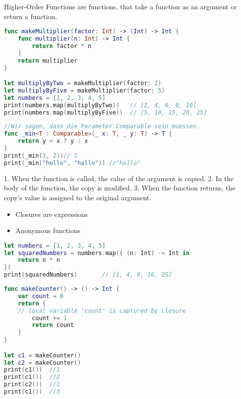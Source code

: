 \begin{breakbox}

Higher-Order Functions are functions, that take a function as an argument or return a function.
\begin{lstlisting}[language=swift]
func makeMultiplier(factor: Int) -> (Int) -> Int {
    func multiplier(n: Int) -> Int {
        return factor * n
    }
    return multiplier
}

let multiplyByTwo = makeMultiplier(factor: 2)
let multiplyByFive = makeMultiplier(factor: 5)
let numbers = [1, 2, 3, 4, 5]
print(numbers.map(multiplyByTwo))   // [2, 4, 6, 8, 10]
print(numbers.map(multiplyByFive))  // [5, 10, 15, 20, 25]
\end{lstlisting}
\end{breakbox}

\begin{breakbox}

\begin{lstlisting}[language=swift]
//Wir sagen, dass die Parameter Comparable sein muessen.
func _min<T : Comparable>(_ x: T, _ y: T) -> T {
    return y < x ? y : x
}
print(_min(1, 2))// 1
print(_min("hello", "hallo")) //"hallo"
\end{lstlisting}
\end{breakbox}

\begin{breakbox}

1. When the function is called,
the value of the argument is copied. 2. In the body of the function, the
copy is modified. 3. When the function returns, the copy's value is
assigned to the original argument.

\end{breakbox}

\begin{breakbox}

\begin{itemize}
\tightlist
\item
  Closures are expressions
\item
  Anonymous functions
\end{itemize}

\begin{lstlisting}[language=swift]
let numbers = [1, 2, 3, 4, 5]
let squaredNumbers = numbers.map({ (n: Int) -> Int in
    return n * n
})
print(squaredNumbers)       // [1, 4, 9, 16, 25]
\end{lstlisting}
\end{breakbox}

\begin{breakbox}

\begin{lstlisting}[language=swift]
func makeCounter() -> () -> Int {
    var count = 0
    return {
    // local variable 'count' is captured by closure
        count += 1
        return count
    }
}

let c1 = makeCounter()
let c2 = makeCounter()
print(c1())  //1
print(c1())  //2
print(c2())  //1
print(c1())  //3
\end{lstlisting}
\end{breakbox}

